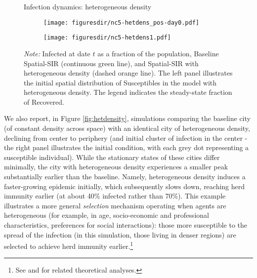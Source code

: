 \documentclass[english,11pt]{article}
\newcommand{\notemix}[4]{\emph{Note:} Infected at date $t$ as a fraction of the population, #1 #2 #3 #4}
\begin{document}
\begin{figure}[t]
    \caption{Infection dynamics: heterogeneous density}\label{fig:hetdensity}
    \centering
    \begin{subfigure}{.4\textwidth}
        \centering
 		\texttt{[image: figuresdir/nc5-hetdens\_pos-day0.pdf]}
    \end{subfigure}%
    \begin{subfigure}{.5\textwidth}
        \centering
      \texttt{[image: figuresdir/nc5-hetdens1.pdf]} 
    \end{subfigure}
    \caption*{\normalfont \footnotesize \notemix{Baseline Spatial-SIR (continuous green line),}{ and Spatial-SIR with heterogeneous density (dashed orange line).}{}{} The 
    left panel 
    illustrates the initial spatial distribution of Susceptibles in the model with heterogeneous density. The legend indicates the steady-state fraction of Recovered.}
\end{figure}

We also report, in Figure \ref{fig:hetdensity},  simulations comparing the baseline city (of constant density across space) with an identical city of heterogeneous density, declining from center to periphery (and initial cluster of infection in the center - the right panel illustrates the initial condition, with each grey dot representing a susceptible individual).
While the stationary states of these cities differ minimally, the city with heterogeneous density experiences a smaller peak substantially earlier than the baseline. Namely, heterogeneous density induces a faster-growing epidemic initially, which subsequently slows down,  reaching herd immunity earlier (at about 40\% infected rather than 70\%). 
This example illustrates a more general 
\emph{selection}
mechanism operating when agents are heterogeneous (for example, in age, socio-economic and professional characteristics, preferences for social interactions): those more susceptible to the spread of the infection (in this simulation, those living in denser regions) are selected to achieve herd immunity earlier.\footnote{See \cite{gomes2020individual} and \cite{britton2020mathematical} for  related theoretical analyses.}  
\end{document}
